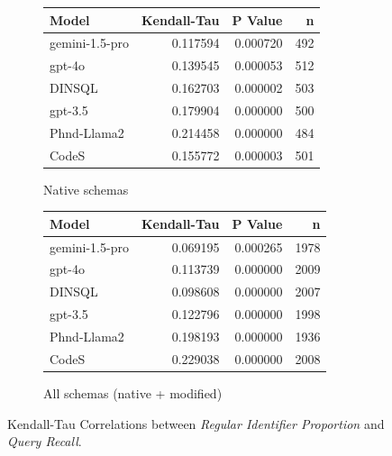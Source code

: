 \begin{figure}
  \centering
  \begin{subfigure}{.5\linewidth}
      \centering
      \begin{tabular}{lrrr}
\toprule
Model & Kendall-Tau & P Value & n \\
\midrule
gemini-1.5-pro & 0.117594 & 0.000720 & 492 \\
gpt-4o & 0.139545 & 0.000053 & 512 \\
DINSQL & 0.162703 & 0.000002 & 503 \\
gpt-3.5 & 0.179904 & 0.000000 & 500 \\
Phnd-Llama2 & 0.214458 & 0.000000 & 484 \\
CodeS & 0.155772 & 0.000003 & 501 \\
\bottomrule
\end{tabular}

      \caption{Native schemas}
      \label{table:nathigh-recall-ktau-native}
  \end{subfigure}%
  \begin{subfigure}{.5\linewidth}
      \centering
      \begin{tabular}{lrrr}
\toprule
Model & Kendall-Tau & P Value & n \\
\midrule
gemini-1.5-pro & 0.069195 & 0.000265 & 1978 \\
gpt-4o & 0.113739 & 0.000000 & 2009 \\
DINSQL & 0.098608 & 0.000000 & 2007 \\
gpt-3.5 & 0.122796 & 0.000000 & 1998 \\
Phnd-Llama2 & 0.198193 & 0.000000 & 1936 \\
CodeS & 0.229038 & 0.000000 & 2008 \\
\bottomrule
\end{tabular}

      \caption{All schemas (native + modified)}
      \label{table:nathigh-recall-ktau-all}
  \end{subfigure}
  \caption{Kendall-Tau Correlations between \emph{Regular Identifier Proportion} and \emph{Query Recall}.}
\end{figure}

